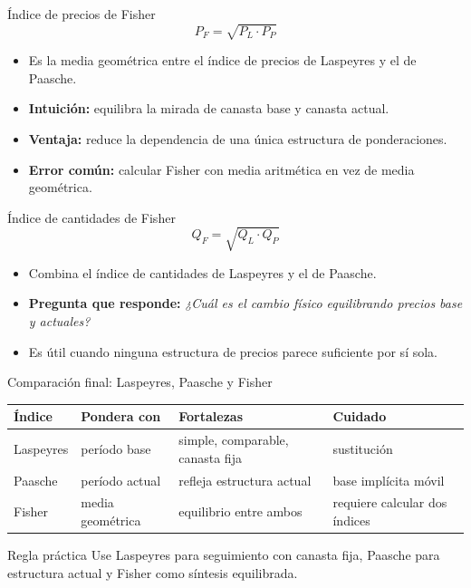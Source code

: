 \documentclass[aspectratio=169,11pt]{beamer}
\newcommand{\pregunta}[1]{\textbf{Pregunta que responde:} \emph{#1}}
\newcommand{\errorcomun}[1]{\textbf{Error común:} #1}
\newcommand{\intuicion}[1]{\textbf{Intuición:} #1}
\begin{document}
\begin{frame}{Índice de precios de Fisher}
\[
P_F=\sqrt{P_L\cdot P_P}
\]
\begin{itemize}
  \item Es la media geométrica entre el índice de precios de Laspeyres y el de Paasche.
  \item \intuicion{equilibra la mirada de canasta base y canasta actual.}
  \item \textbf{Ventaja:} reduce la dependencia de una única estructura de ponderaciones.
  \item \errorcomun{calcular Fisher con media aritmética en vez de media geométrica.}
\end{itemize}
\end{frame}

\begin{frame}{Índice de cantidades de Fisher}
\[
Q_F=\sqrt{Q_L\cdot Q_P}
\]
\begin{itemize}
  \item Combina el índice de cantidades de Laspeyres y el de Paasche.
  \item \pregunta{¿Cuál es el cambio físico equilibrando precios base y actuales?}
  \item Es útil cuando ninguna estructura de precios parece suficiente por sí sola.
\end{itemize}
\end{frame}

\begin{frame}{Comparación final: Laspeyres, Paasche y Fisher}
\small
\begin{center}
\begin{tabular}{p{}p{}p{}p{}}
\toprule
Índice & Pondera con & Fortalezas & Cuidado \\
\midrule
Laspeyres & período base & simple, comparable, canasta fija & sustitución \\
Paasche & período actual & refleja estructura actual & base implícita móvil \\
Fisher & media geométrica & equilibrio entre ambos & requiere calcular dos índices \\
\bottomrule
\end{tabular}
\end{center}
\begin{block}{Regla práctica}
Use Laspeyres para seguimiento con canasta fija, Paasche para estructura actual y Fisher como síntesis equilibrada.
\end{block}
\end{frame}
\end{document}
